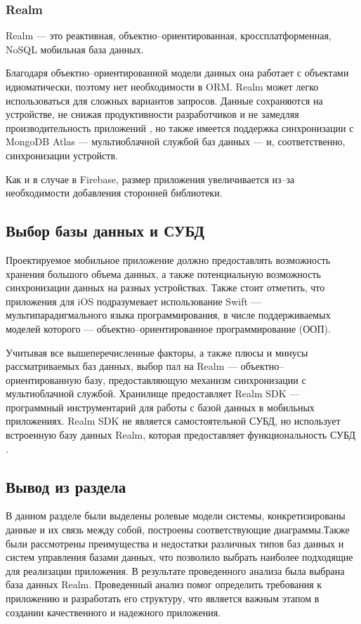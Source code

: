 \subsubsection{Realm}

Realm \cite{realm} --- это реактивная, объектно--ориентированная, кроссплатформенная, NoSQL \cite{nosql} мобильная база данных. 

Благодаря объектно--ориентированной модели данных она работает с объектами идиоматически, поэтому нет необходимости в ORM. Realm может легко использоваться для сложных вариантов запросов. Данные сохраняются на устройстве, не снижая продуктивности разработчиков и не замедляя производительность приложений \cite{iosdb}, но также имеется поддержка синхронизации с MongoDB Atlas --- мультиоблачной службой баз данных \cite{atlas} --- и, соответственно, синхронизации устройств. 

Как и в случае в Firebase, размер приложения увеличивается из--за необходимости добавления сторонней библиотеки. 

\subsection{Выбор базы данных и СУБД}

Проектируемое мобильное приложение должно предоставлять возможность хранения большого объема данных, а также потенциальную возможность синхронизации данных на разных устройствах. Также стоит отметить, что приложения для iOS подразумевает использование Swift \cite{swift} --- мультипарадигмального языка программирования, в числе поддерживаемых моделей которого --- объектно--ориентированное программирование (ООП).

Учитывая все вышеперечисленные факторы, а также плюсы и минусы рассматриваемых баз данных, выбор пал на Realm --- объектно--ориентированную базу, предоставляющую механизм синхронизации с мультиоблачной службой. Хранилище предоставляет Realm SDK --- программный инструментарий для работы с базой данных в мобильных приложениях. Realm SDK не является самостоятельной СУБД, но использует встроенную базу данных Realm, которая предоставляет функциональность СУБД  \cite{subd}.

\subsection{Вывод из раздела}

В данном разделе были выделены ролевые модели системы, конкретизированы данные и их связь между собой, построены соответствующие диаграммы.Также были рассмотрены преимущества и недостатки различных типов баз данных и систем управления базами данных, что позволило выбрать наиболее подходящие для реализации приложения. В результате проведенного анализа была выбрана база данных Realm. Проведенный анализ помог определить требования к приложению и разработать его структуру, что является важным этапом в создании качественного и надежного приложения.
